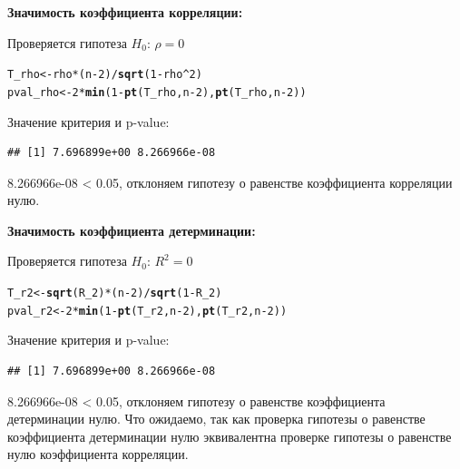 \documentclass{article}\usepackage[]{graphicx}\usepackage[]{color}
\makeatletter
\newcommand{\hlnum}[1]{\textcolor[rgb]{0.686,0.059,0.569}{#1}}%
\newcommand{\hlopt}[1]{\textcolor[rgb]{0,0,0}{#1}}%
\newcommand{\hlstd}[1]{\textcolor[rgb]{0.345,0.345,0.345}{#1}}%
\newcommand{\hlkwb}[1]{\textcolor[rgb]{0.69,0.353,0.396}{#1}}%
\newcommand{\hlkwd}[1]{\textcolor[rgb]{0.737,0.353,0.396}{\textbf{#1}}}%
\newenvironment{kframe}{%
 \def\at@end@of@kframe{}%
 \ifinner\ifhmode%
  \def\at@end@of@kframe{\end{minipage}}%
  \begin{minipage}{\columnwidth}%
 \fi\fi%
 \def\FrameCommand##1{\hskip\@totalleftmargin \hskip-\fboxsep
 \colorbox{shadecolor}{##1}\hskip-\fboxsep
     \hskip-\linewidth \hskip-\@totalleftmargin \hskip\columnwidth}%
 \MakeFramed {\advance\hsize-\width
   \@totalleftmargin\z@ \linewidth\hsize
   \@setminipage}}%
 {\par\unskip\endMakeFramed%
 \at@end@of@kframe}
\newenvironment{knitrout}{}{} %
\makeatother
\begin{document}
\textbf{Значимость коэффициента корреляции:}

Проверяется гипотеза $H_0$: $\rho = 0$
\begin{knitrout}
\color{fgcolor}\begin{kframe}
\begin{alltt}
\hlstd{T_rho}\hlkwb{<-} \hlstd{rho} \hlopt{*} \hlstd{(n} \hlopt{-} \hlnum{2}\hlstd{)} \hlopt{/} \hlkwd{sqrt}\hlstd{(}\hlnum{1} \hlopt{-} \hlstd{rho}\hlopt{^}\hlnum{2}\hlstd{)}
\hlstd{pval_rho} \hlkwb{<-} \hlnum{2} \hlopt{*} \hlkwd{min}\hlstd{(}\hlnum{1} \hlopt{-} \hlkwd{pt}\hlstd{(T_rho, n} \hlopt{-} \hlnum{2}\hlstd{),} \hlkwd{pt}\hlstd{(T_rho, n} \hlopt{-} \hlnum{2}\hlstd{))}
\end{alltt}
\end{kframe}
\end{knitrout}
Значение критерия и p-value:
\begin{knitrout}
\color{fgcolor}\begin{kframe}
\begin{verbatim}
## [1] 7.696899e+00 8.266966e-08
\end{verbatim}
\end{kframe}
\end{knitrout}
8.266966e-08 < 0.05, отклоняем гипотезу о равенстве коэффициента корреляции нулю.

\textbf{Значимость коэффициента детерминации:}

Проверяется гипотеза $H_0$: $R^2 = 0$
\begin{knitrout}
\color{fgcolor}\begin{kframe}
\begin{alltt}
\hlstd{T_r2}\hlkwb{<-} \hlkwd{sqrt}\hlstd{(R_2)} \hlopt{*} \hlstd{(n} \hlopt{-} \hlnum{2}\hlstd{)} \hlopt{/} \hlkwd{sqrt}\hlstd{(}\hlnum{1} \hlopt{-} \hlstd{R_2)}
\hlstd{pval_r2} \hlkwb{<-} \hlnum{2} \hlopt{*} \hlkwd{min}\hlstd{(}\hlnum{1} \hlopt{-} \hlkwd{pt}\hlstd{(T_r2, n} \hlopt{-} \hlnum{2}\hlstd{),} \hlkwd{pt}\hlstd{(T_r2, n} \hlopt{-} \hlnum{2}\hlstd{))}
\end{alltt}
\end{kframe}
\end{knitrout}
Значение критерия и p-value:
\begin{knitrout}
\color{fgcolor}\begin{kframe}
\begin{verbatim}
## [1] 7.696899e+00 8.266966e-08
\end{verbatim}
\end{kframe}
\end{knitrout}
8.266966e-08 < 0.05, отклоняем гипотезу о равенстве коэффициента детерминации нулю. Что ожидаемо, так как проверка гипотезы о равенстве коэффициента детерминации нулю эквивалентна проверке гипотезы о равенстве нулю коэффициента корреляции.
\end{document}

